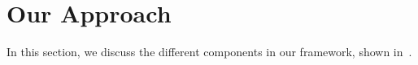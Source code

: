 \section{Our Approach}
\label{sec:our_approach}
In this section, we discuss the different components in our  framework, shown in~. 
%
% 
% 
